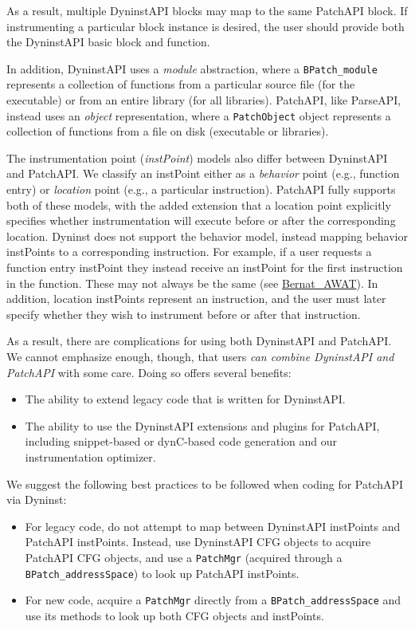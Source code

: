 As a result, multiple DyninstAPI blocks may map to the same PatchAPI
block. If instrumenting a particular block instance is desired, the
user should provide both the DyninstAPI basic block and function. 

In addition, DyninstAPI uses a \emph{module} abstraction, where
a \texttt{BPatch\_module} represents a collection of functions from a
particular source file (for the executable) or from an entire library
(for all libraries). PatchAPI, like ParseAPI, instead uses
an \emph{object} representation, where a \texttt{PatchObject} object
represents a collection of functions from a file on disk (executable
or libraries). 

The instrumentation point (\emph{instPoint}) models also differ
between DyninstAPI and PatchAPI. We classify an instPoint either as
a \emph{behavior} point (e.g., function entry) or \emph{location}
point (e.g., a particular instruction). PatchAPI fully supports both
of these models, with the added extension that a location point
explicitly specifies whether instrumentation will execute before or
after the corresponding location. Dyninst does not support the
behavior model, instead mapping behavior instPoints to a corresponding
instruction. For example, if a user requests a function entry
instPoint they instead receive an instPoint for the first instruction
in the function. These may not always be the
same (see \href{ftp://ftp.cs.wisc.edu/paradyn/papers/Bernat11AWAT.pdf}{Bernat\_AWAT}). In addition, location instPoints represent an
instruction, and the user must later specify whether they wish to
instrument before or after that instruction.

As a result, there are complications for using both DyninstAPI and
PatchAPI. We cannot emphasize enough, though, that users \emph{can
combine DyninstAPI and PatchAPI} with some care. Doing so offers
several benefits:
\begin{itemize}
\item The ability to extend legacy code that is written for
DyninstAPI. 
\item The ability to use the DyninstAPI extensions and plugins for
PatchAPI, including snippet-based or dynC-based code generation and
our instrumentation optimizer. 
\end{itemize}
We suggest the following best practices to be followed when coding for
PatchAPI via Dyninst:
\begin{itemize}
\item For legacy code, do not attempt to map between DyninstAPI
instPoints and PatchAPI instPoints. Instead, use DyninstAPI CFG
objects to acquire PatchAPI CFG objects, and use a \texttt{PatchMgr} (acquired
through a \texttt{BPatch\_addressSpace}) to look up
PatchAPI instPoints. 
\item For new code, acquire a \texttt{PatchMgr} directly from
a \texttt{BPatch\_addressSpace} and use its methods to look up both
CFG objects and instPoints. 
\end{itemize}

